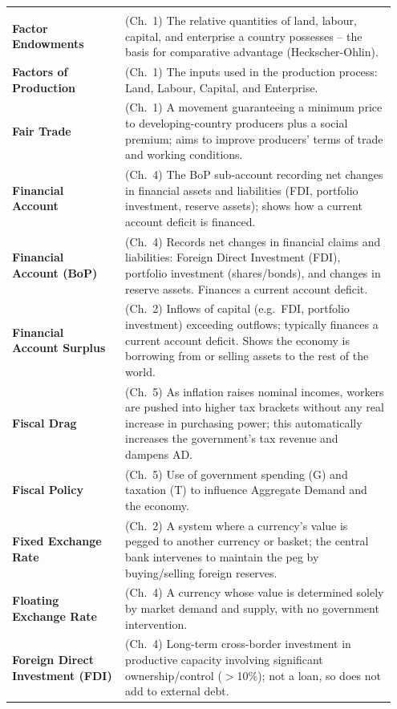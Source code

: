 \documentclass[11pt, a4paper, twoside]{book}
\begin{document}
\begin{longtable}{@{}>{\RaggedRight\arraybackslash}p{0.28\linewidth}>{\RaggedRight\arraybackslash}p{0.67\linewidth}@{}}
\multicolumn{2}{@{}l}{\textbf{\Large\color{CurveNavy} F}} \\[2pt]
\textbf{Factor Endowments} & (Ch.~1) The relative quantities of land, labour, capital, and enterprise a country possesses -- the basis for comparative advantage (Heckscher-Ohlin). \\
\textbf{Factors of Production} & (Ch.~1) The inputs used in the production process: Land, Labour, Capital, and Enterprise. \\
\textbf{Fair Trade} & (Ch.~1) A movement guaranteeing a minimum price to developing-country producers plus a social premium; aims to improve producers' terms of trade and working conditions. \\
\textbf{Financial Account} & (Ch.~4) The BoP sub-account recording net changes in financial assets and liabilities (FDI, portfolio investment, reserve assets); shows how a current account deficit is financed. \\
\textbf{Financial Account (BoP)} & (Ch.~4) Records net changes in financial claims and liabilities: Foreign Direct Investment (FDI), portfolio investment (shares/bonds), and changes in reserve assets. Finances a current account deficit. \\
\textbf{Financial Account Surplus} & (Ch.~2) Inflows of capital (e.g.\ FDI, portfolio investment) exceeding outflows; typically finances a current account deficit. Shows the economy is borrowing from or selling assets to the rest of the world. \\
\textbf{Fiscal Drag} & (Ch.~5) As inflation raises nominal incomes, workers are pushed into higher tax brackets without any real increase in purchasing power; this automatically increases the government's tax revenue and dampens AD. \\
\textbf{Fiscal Policy} & (Ch.~5) Use of government spending (G) and taxation (T) to influence Aggregate Demand and the economy. \\
\textbf{Fixed Exchange Rate} & (Ch.~2) A system where a currency's value is pegged to another currency or basket; the central bank intervenes to maintain the peg by buying/selling foreign reserves. \\
\textbf{Floating Exchange Rate} & (Ch.~4) A currency whose value is determined solely by market demand and supply, with no government intervention. \\
\textbf{Foreign Direct Investment (FDI)} & (Ch.~4) Long-term cross-border investment in productive capacity involving significant ownership/control ($>$10\%); not a loan, so does not add to external debt. \\

\end{longtable}
\end{document}
